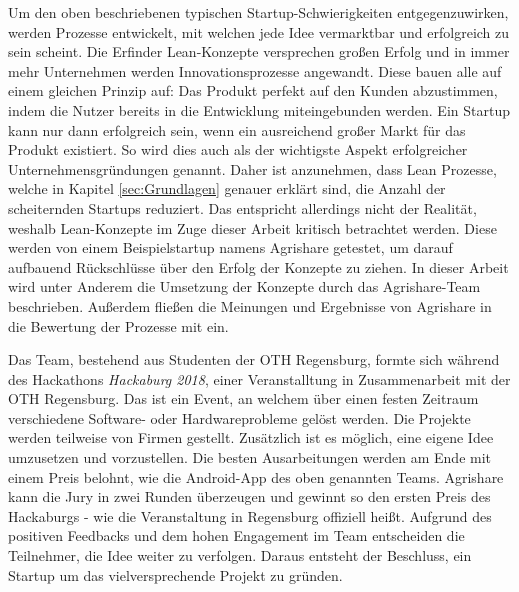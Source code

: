 Um den oben beschriebenen typischen Startup-Schwierigkeiten entgegenzuwirken, werden Prozesse entwickelt, mit welchen jede Idee vermarktbar und erfolgreich zu sein scheint. Die Erfinder Lean-Konzepte versprechen großen Erfolg und in immer mehr Unternehmen werden Innovationsprozesse angewandt. Diese bauen alle auf einem gleichen Prinzip auf: Das Produkt perfekt auf den Kunden abzustimmen, indem die Nutzer bereits in die Entwicklung miteingebunden werden. Ein Startup kann nur dann erfolgreich sein, wenn ein ausreichend großer Markt für das Produkt existiert. So wird dies auch als der wichtigste Aspekt erfolgreicher Unternehmensgründungen genannt. Daher ist anzunehmen, dass Lean Prozesse, welche in Kapitel \ref{sec:Grundlagen} genauer erklärt sind, die Anzahl der scheiternden Startups reduziert. Das entspricht allerdings nicht der Realität, weshalb Lean-Konzepte im Zuge dieser Arbeit kritisch betrachtet werden.\cite{patel201590} Diese werden von einem Beispielstartup namens Agrishare getestet, um darauf aufbauend Rückschlüsse über den Erfolg der Konzepte zu ziehen. In dieser Arbeit wird unter Anderem die Umsetzung der Konzepte durch das Agrishare-Team beschrieben. Außerdem fließen die Meinungen und Ergebnisse von Agrishare in die Bewertung der Prozesse mit ein.

Das Team, bestehend aus Studenten der OTH Regensburg, formte sich während des Hackathons \textit{Hackaburg 2018}, einer Veranstalltung in Zusammenarbeit mit der OTH Regensburg. Das ist ein Event, an welchem über einen festen Zeitraum verschiedene Software- oder Hardwareprobleme gelöst werden. Die Projekte werden teilweise von Firmen gestellt. Zusätzlich ist es möglich, eine eigene Idee umzusetzen und vorzustellen. Die besten Ausarbeitungen werden am Ende mit einem Preis belohnt, wie die Android-App des oben genannten Teams. Agrishare kann die Jury in zwei Runden überzeugen und gewinnt so den ersten Preis des Hackaburgs - wie die Veranstaltung in Regensburg offiziell heißt. Aufgrund des positiven Feedbacks und dem hohen Engagement im Team entscheiden die Teilnehmer, die Idee weiter zu verfolgen. Daraus entsteht der Beschluss, ein Startup um das vielversprechende Projekt zu gründen.

\newpage


